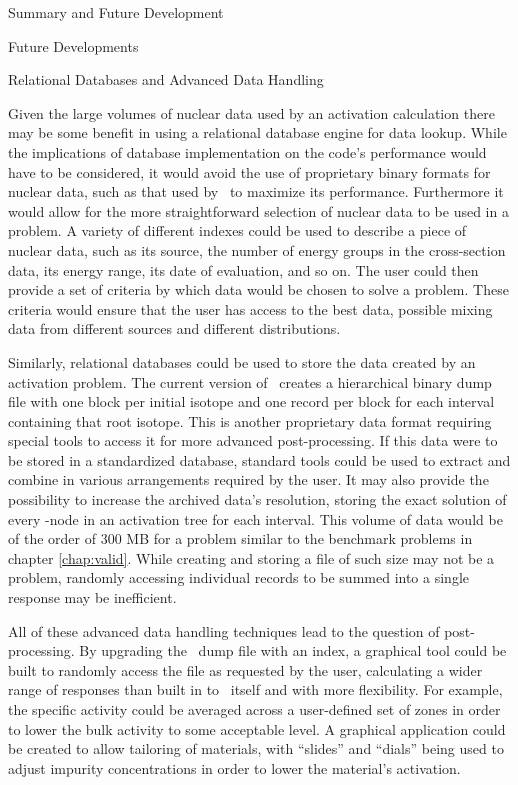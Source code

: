 \begin{chapter}{Summary and Future Development}
\begin{section}{Future Developments}
    \begin{subsection}{Relational Databases and Advanced Data Handling}
      
      Given the large volumes of nuclear data used by an activation
      calculation there may be some benefit in using a relational
      database engine for data lookup.  While the implications of
      database implementation on the code's performance would have to
      be considered, it would avoid the use of proprietary binary
      formats for nuclear data, such as that used by \ALARA\  to
      maximize its performance.  Furthermore it would allow for the
      more straightforward selection of nuclear data to be used in a
      problem.  A variety of different indexes could be used to
      describe a piece of nuclear data, such as its source, the number
      of energy groups in the cross-section data, its energy range,
      its date of evaluation, and so on.  The user could then provide
      a set of criteria by which data would be chosen to solve a
      problem.  These criteria would ensure that the user has access
      to the best data, possible mixing data from different sources
      and different distributions.
      
      Similarly, relational databases could be used to store the data
      created by an activation problem.  The current version of
      \ALARA\  creates a hierarchical binary dump file with one block
      per initial isotope and one record per block for each interval
      containing that root isotope.  This is another proprietary data
      format requiring special tools to access it for more advanced
      post-processing.  If this data were to be stored in a
      standardized database, standard tools could be used to extract
      and combine in various arrangements required by the user.  It
      may also provide the possibility to increase the archived data's
      resolution, storing the exact solution of every \pc-node in an
      activation tree for each interval.  This volume of data would be
      of the order of 300 MB for a problem similar to the benchmark
      problems in chapter \ref{chap:valid}.  While creating and
      storing a file of such size may not be a problem, randomly
      accessing individual records to be summed into a single response
      may be inefficient.
      
      All of these advanced data handling techniques lead to the
      question of post-processing.  By upgrading the \ALARA\  dump file
      with an index, a graphical tool could be built to randomly
      access the file as requested by the user, calculating a wider
      range of responses than built in to \ALARA\  itself and with more
      flexibility.  For example, the specific activity could be
      averaged across a user-defined set of zones in order to lower
      the bulk activity to some acceptable level.  A graphical
      application could be created to allow tailoring of materials,
      with ``slides'' and ``dials'' being used to adjust impurity
      concentrations in order to lower the material's activation.
    \end{subsection}


\end{section}
\end{chapter}
